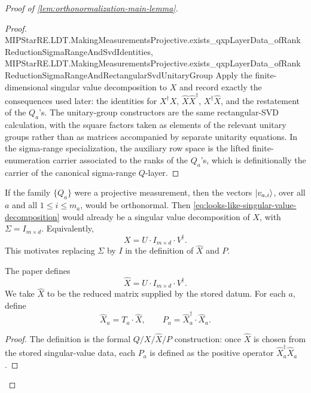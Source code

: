 \begin{proof}[Proof of \ref{lem:orthonormalization-main-lemma}]
\begin{proof}
{			MIPStarRE.LDT.MakingMeasurementsProjective.exists_qxpLayerData_ofRankReductionSigmaRangeAndSvdIdentities,
			MIPStarRE.LDT.MakingMeasurementsProjective.exists_qxpLayerData_ofRankReductionSigmaRangeAndRectangularSvdUnitaryGroup}
		\leanok
		Apply the finite-dimensional singular value decomposition to \(X\) and
		record exactly the consequences used later: the identities for
		\(X^\dagger X\), \(\widehat X\widehat X^\dagger\),
		\(X^\dagger\widehat X\), and the restatement of the \(Q_a\)'s.  The
		unitary-group constructors are the same rectangular-SVD calculation, with
		the square factors taken as elements of the relevant unitary groups
		rather than as matrices accompanied by separate unitarity equations.  In
		the sigma-range specialization, the auxiliary row space is the lifted
		finite-enumeration carrier associated to the ranks of the \(Q_a\)'s, which
		is definitionally the carrier of the canonical sigma-range \(Q\)-layer.
	\end{proof}

	\begin{remark}\label{rem:motivation-for-P}
		If the family $\{Q_a\}$ were a projective measurement, then the vectors
		$\lvert v_{a,i} \rangle$, over all $a$ and all $1 \leq i \leq m_a$, would be orthonormal.
		Then \eqref{eq:looks-like-singular-value-decomposition} would already be a singular value
		decomposition of $X$, with $\Sigma = I_{m \times d}$. Equivalently,
		\[
			X = U \cdot I_{m \times d} \cdot V^\dagger.
		\]
		This motivates replacing $\Sigma$ by $I$ in the definition of $\widehat X$ and $P$.
	\end{remark}

	\begin{definition}[Definition of~$P$]\label{def:projective-P}
		\leanok
		The paper defines
		\[
			\widehat{X} = U \cdot I_{m \times d} \cdot V^\dagger.
		\]
		We take $\widehat X$ to be the reduced matrix supplied by the stored datum.
		For each $a$, define
		\[
			\widehat{X}_a = T_a \cdot \widehat{X},
			\qquad
			P_a = \widehat{X}_a^\dagger \cdot \widehat{X}_a.
		\]
	\end{definition}
	\begin{proof}
		\leanok
		The definition is the formal \(Q/X/\widehat X/P\) construction: once
		\(\widehat X\) is chosen from the stored singular-value data, each
		\(P_a\) is defined as the positive operator
		\(\widehat X_a^\dagger\widehat X_a\).
	\end{proof}


\end{proof}
